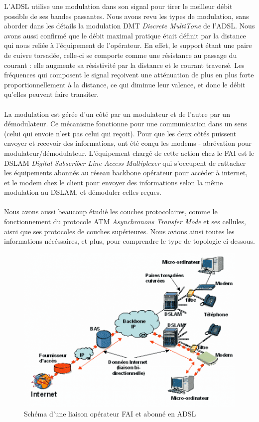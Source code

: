 L'ADSL utilise une modulation dans son signal pour tirer le meilleur débit possible de ses bandes passantes. Nous avons revu les types de modulation, sans aborder dans les détails la modulation DMT \textit{Discrete MultiTone} de l'ADSL. Nous avons aussi confirmé que le débit maximal pratique était définit par la distance qui nous reliée à l'équipement de l'opérateur. En effet, le support étant une paire de cuivre torsadée, celle-ci se comporte comme une résistance au passage du courant : elle augmente sa résistivité par la distance et le courant traversé. Les fréquences qui composent le signal reçoivent une atténuation de plus en plus forte proportionnellement à la distance, ce qui diminue leur valence, et donc le débit qu'elles peuvent faire transiter.
\\ \\
La modulation est gérée d'un côté par un modulateur et de l'autre par un démodulateur. Ce mécanisme fonctionne pour une communication dans un sens (celui qui envoie n'est pas celui qui reçoit). Pour que les deux côtés puissent envoyer et recevoir des informations, ont été conçu les modems - abrévation pour modulateur/démodulateur. L'équipement chargé de cette action chez le FAI est le DSLAM \textit{Digital Subscriber Line Access Multiplexer} qui s'occupent de rattacher les équipements abonnés au réseau backbone opérateur pour accéder à internet, et le modem chez le client pour envoyer des informations selon la même modulation au DSLAM, et démoduler celles reçues.
\\ \\
Nous avons aussi beaucoup étudié les couches protocolaires, comme le fonctionnement du protocole ATM \textit{Asynchronous Transfer Mode} et ses cellules, aisni que ses protocoles de couches supérieures. Nous avions ainsi toutes les informations nécéssaires, et plus, pour comprendre le type de topologie ci dessous.

\begin{figure}[h]
    \centering
    \includegraphics[width=1\linewidth]{imgs/tmp_adsl2.png}
    \caption{Schéma d'une liaison opérateur FAI et abonné en ADSL}
    \label{fig:tmp_adsl2}
\end{figure}

